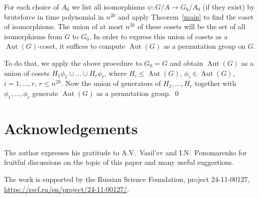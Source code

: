 \documentclass{article}
\DeclareMathOperator{\Aut}{Aut}
\begin{document}
For each choice of \( A_0 \) we list all isomorphisms \( \psi : G/A \to G_0/A_0 \) (if they exist) by bruteforce in time polynomial in \( n^{2k} \)
and apply Theorem~\ref{main} to find the coset of isomorphisms. The union of at most \( n^{2k} \) of these cosets will be the set of all
isomorphisms from \( G \) to \( G_0 \). In order to express this union of cosets as a \( \Aut(G) \)-coset,
it suffices to compute \( \Aut(G) \) as a permutation group on \( G \).

To do that, we apply the above procedure to \( G_0 = G \) and obtain \( \Aut(G) \) as a union of cosets
\( H_1\phi_1 \cup \dots \cup H_r\phi_r \), where \( H_i \leq \Aut(G) \), \( \phi_i \in \Aut(G) \), \( i = 1, \dots, r \), \( r \leq n^{2k} \).
Now the union of generators of \( H_1, \dots, H_r \) together with \( \phi_1, \dots, \phi_r \) generate \( \Aut(G) \) as a permutation group.
\qed

\section{Acknowledgements}

The author expresses his gratitude to A.V.~Vasil'ev and I.N.~Ponomarenko for fruitful discussions on the topic of this paper and many useful suggestions.

The work is supported by the Russian Science Foundation, project 24-11-00127, \url{https://rscf.ru/en/project/24-11-00127/}.
\end{document}
